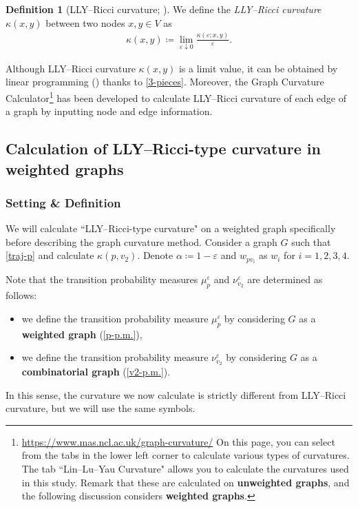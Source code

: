 \documentclass{article}
\numberwithin{equation}{section}
\theoremstyle{definition}
\newtheorem{definition}{Definition}[section]
\newcommand{\A}{\alpha}
\newcommand{\K}{\kappa}
\newcommand{\eps}{\varepsilon} %
\newcommand{\dto}{\downarrow}
\newcommand{\kexy}{\kappa(\eps;x,y)}
\newcommand{\kxy}{\kappa(x,y)}
\def\:={\coloneqq} %
\begin{document}
\begin{definition}[LLY--Ricci curvature; \cite{LLY}] \label{LLY-curv}
We define the \emph{LLY--Ricci curvature} $\kxy$ between two nodes $x,y\in V$ as
\begin{align*}
\kxy\:=\lim_{\eps\dto0}\frac{\kexy}{\eps}. 
\end{align*}
\end{definition}

Although LLY--Ricci curvature $\kxy$ is a limit value, it can be obtained by linear programming (\cite{CKLLS}) thanks to \autoref{3-pieces}.
Moreover, the Graph Curvature Calculator\footnote{\url{https://www.mas.ncl.ac.uk/graph-curvature/}
On this page, you can select from the tabs in the lower left corner to calculate various types of curvatures.
The tab ``Lin--Lu--Yau Curvature" allows you to calculate the curvatures used in this study.
Remark that these are calculated on \textbf{unweighted graphs}, and the following discussion considers \textbf{weighted graphs}.} 
has been developed to calculate LLY--Ricci curvature of each edge of a graph by inputting node and edge information.


\subsection*{Calculation of LLY--Ricci-type curvature in weighted graphs} \label{section:weighted graph}

\subsubsection*{Setting \& Definition}

We will calculate ``LLY--Ricci-type curvature" on a weighted graph specifically before describing the graph curvature method.
Consider a graph $G$ such that \autoref{traj-p} and calculate $\K(p,v_2)$.
Denote $\A\:=1-\eps$ and $w_{pv_i}$ as $w_i$ for $i=1,2,3,4$.

Note that the transition probability measures $\mu_p^\eps$ and $\nu_{v_2}^\eps$ are determined as follows:
\begin{itemize}
    \item we define the transition probability measure $\mu_{p}^\eps$ by considering $G$ as a \textbf{weighted graph} (\autoref{p-p.m.}),
    \item we define the transition probability measure $\nu_{v_2}^\eps$ by considering $G$ as a \textbf{combinatorial graph} (\autoref{v2-p.m.}).
\end{itemize}
In this sense, the curvature we now calculate is strictly different from LLY--Ricci curvature, but we will use the same symbols.
\end{document}
